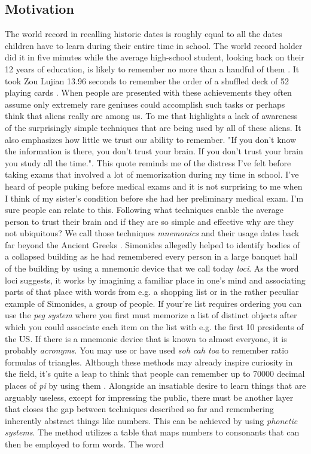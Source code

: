 \subsection{Motivation} \label{sec:body_motivation}

The world record in recalling historic dates is roughly equal to all the dates children have to learn during their entire time in school. The world record holder did it in five minutes while the average high-school student, looking back on their 12 years of education, is likely to remember no more than a handful of them \cite{how_to_become_a_memory_master}. It took Zou Lujian 13.96 seconds to remember the order of a shuffled deck of 52 playing cards \cite{record_recall_playing_cards}. When people are presented with these achievements they often assume only extremely rare geniuses could accomplish such tasks or perhaps think that aliens really are among us. To me that highlights a lack of awareness of the surprisingly simple techniques that are being used by all of these aliens. It also emphasizes how little we trust our ability to remember. "If you don't know the information is there, you don't trust your brain. If you don't trust your brain you study all the time."\cite{how_to_become_a_memory_master}. This quote reminds me of the distress I've felt before taking exams that involved a lot of memorization during my time in school. I've heard of people puking before medical exams and it is not surprising to me when I think of my sister's condition before she had her preliminary medical exam. I'm sure people can relate to this. Following what techniques enable the average person to trust their brain and if they are so simple and effective why are they not ubiquitous? We call those techniques \emph{mnemonics} and their usage dates back far beyond the Ancient Greeks \cite{white_2014}. Simonides allegedly helped to identify bodies of a collapsed building as he had remembered every person in a large banquet hall of the building by using a mnemonic device that we call today \emph{loci}. As the word loci suggests, it works by imagining a familiar place in one's mind and associating parts of that place with words from e.g. a shopping list or in the rather peculiar example of Simonides, a group of people. If your're list requires ordering you can use the \emph{peg system} where you first must memorize a list of distinct objects after which you could associate each item on the list with e.g. the first 10 presidents of the US. If there is a mnemonic device that is known to almost everyone, it is probably \emph{acronyms}. You may use or have used \emph{soh cah toa} to remember ratio formulas of triangles. Although these methods may already inspire curiosity in the field, it's quite a leap to think that people can remember up to 70000 decimal places of \emph{pi} by using them \cite{record_decimal_pi}. Alongside an insatiable desire to learn things that are arguably useless, except for impressing the public, there must be another layer that closes the gap between techniques described so far and remembering inherently abstract things like numbers. This can be achieved by using \emph{phonetic systems}. The method utilizes a table that maps numbers to consonants that can then be employed to form words. The word 
